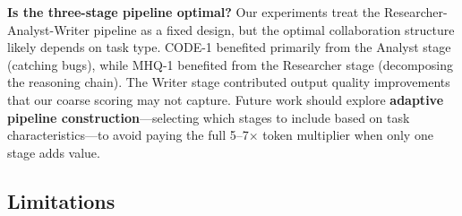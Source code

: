 \documentclass[sigconf,nonacm]{acmart}
\begin{document}
\textbf{Is the three-stage pipeline optimal?} Our experiments treat the Researcher-Analyst-Writer pipeline as a fixed design, but the optimal collaboration structure likely depends on task type. CODE-1 benefited primarily from the Analyst stage (catching bugs), while MHQ-1 benefited from the Researcher stage (decomposing the reasoning chain). The Writer stage contributed output quality improvements that our coarse scoring may not capture. Future work should explore \textbf{adaptive pipeline construction}—selecting which stages to include based on task characteristics—to avoid paying the full 5--7$\times$ token multiplier when only one stage adds value.

\subsection{Limitations}
\end{document}
